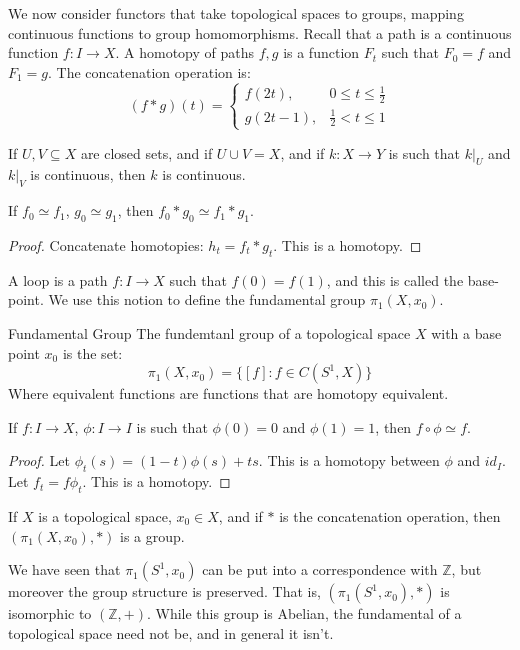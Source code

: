     We now consider functors that take topological spaces to
    groups, mapping continuous functions to group homomorphisms.
    Recall that a path is a continuous function $f:I\rightarrow{X}$.
    A homotopy of paths $f,g$ is a function $F_{t}$ such that
    $F_{0}=f$ and $F_{1}=g$. The concatenation operation is:
    \begin{equation}
        (f*g)(t)=
        \begin{cases}
            f(2t),&0\leq{t}\leq\frac{1}{2}\\
            g(2t-1),&\frac{1}{2}<t\leq{1}
        \end{cases}
    \end{equation}
    \begin{theorem}
        If $U,V\subseteq{X}$ are closed sets, and if
        $U\cup{V}=X$, and if $k:X\rightarrow{Y}$ is such that
        $k|_{U}$ and $k|_{V}$ is continuous, then $k$ is continuous.
    \end{theorem}
    \begin{theorem}
        If $f_{0}\simeq{f}_{1}$, $g_{0}\simeq{g}_{1}$, then
        $f_{0}*g_{0}\simeq{f}_{1}*g_{1}$.
    \end{theorem}
    \begin{proof}
        Concatenate homotopies: $h_{t}=f_{t}*g_{t}$. This is a
        homotopy.
    \end{proof}
    A loop is a path $f:I\rightarrow{X}$ such that $f(0)=f(1)$, and
    this is called the base-point. We use this notion to define the
    fundamental group $\pi_{1}(X,x_{0})$.
    \begin{ldefinition}{Fundamental Group}
        The fundemtanl group of a topological space $X$ with a
        base point $x_{0}$ is the set:
        \begin{equation}
            \pi_{1}(X,x_{0})=\{[f]:f\in{C}(S^{1},X)\}
        \end{equation}
        Where equivalent functions are functions that are homotopy
        equivalent.
    \end{ldefinition}
    \begin{theorem}
        If $f:I\rightarrow{X}$, $\phi:I\rightarrow{I}$ is such that
        $\phi(0)=0$ and $\phi(1)=1$, then $f\circ\phi\simeq{f}$.
    \end{theorem}
    \begin{proof}
        Let $\phi_{t}(s)=(1-t)\phi(s)+ts$. This is a homotopy between
        $\phi$ and $id_{I}$. Let $f_{t}=f\phi_{t}$. This is a
        homotopy.
    \end{proof}
    \begin{theorem}
        If $X$ is a topological space, $x_{0}\in{X}$, and if
        $*$ is the concatenation operation, then
        $(\pi_{1}(X,x_{0}),*)$ is a group.
    \end{theorem}
    \begin{example}
        We have seen that $\pi_{1}(S^{1},x_{0})$ can be put into
        a correspondence with $\mathbb{Z}$, but moreover the
        group structure is preserved. That is,
        $(\pi_{1}(S^{1},x_{0}),*)$ is isomorphic to
        $(\mathbb{Z},+)$. While this group is Abelian,
        the fundamental of a topological space need not be, and
        in general it isn't.
    \end{example}
